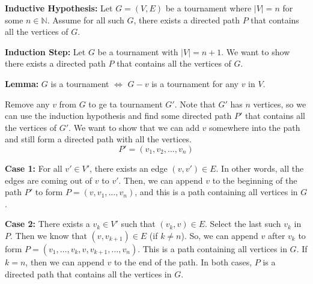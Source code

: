 \documentclass[12pt]{article}
\begin{document}
\begin{enumerate}[start=1,label={\bfseries Problem \arabic*:},leftmargin=1in]
    \textbf{Inductive Hypothesis:} Let $G = (V, E)$ be a tournament where $|V| = n$ for some $n \in \mathbb{N}$. Assume for all such $G$, there exists a directed path $P$ that contains all the vertices of $G$. 

    \textbf{Induction Step:} Let $G$ be a tournament with $|V| = n+1$. We want to show there exists a directed path $P$ that contains all the vertices of $G$. 

    \textbf{Lemma:} $G$ is a tournament $\Longleftrightarrow$ $G-v$ is a tournament for any $v$ in $V$. 

    Remove any $v$ from $G$ to ge ta tournament $G'$. Note that $G'$ has $n$ vertices, so we can use the induction hypothesis and find some directed path $P'$ that contains all the vertices of $G'$. 
    We want to show that we can add $v$ somewhere into the path and still form a directed path with all the vertices. 
    \[
        P' = (v_{1}, v_{2}, \dots, v_{n})
    \]

    \textbf{Case 1:} For all $v' \in V'$, there exists an edge $(v, v') \in E$. In other words, all the edges are coming out of $v$ to $v'$. 
    Then, we can append $v$ to the beginning of the path $P'$ to form $P = (v, v_{1}, \dots, v_{n})$, and this is a path containing all vertices in $G$. 

    \textbf{Case 2:} There exists a $v_{k} \in V'$ such that $(v_{k}, v) \in E$. Select the last such $v_{k}$ in $P$. Then we know that $(v, v_{k+1}) \in E$ (if $k \neq n$). 
    So, we can append $v$ after $v_{k}$ to form $P = (v_{1}, \dots, v_{k}, v, v_{k+1}, \dots, v_{n})$. This is a path containing all vertices in $G$.
    If $k = n$, then we can append $v$ to the end of the path. In both cases, $P$ is a directed path that contains all the vertices in $G$. 
    
\end{enumerate}
\end{document}
